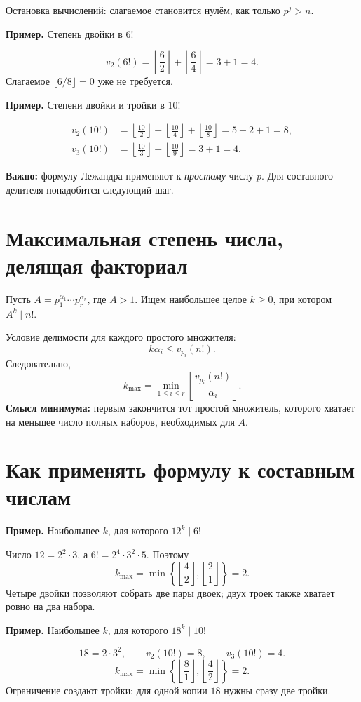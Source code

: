 \documentclass[a4paper,11pt]{article}
\newcommand{\key}[1]{\textcolor{deepaccent}{#1}}
\newcommand{\ex}[1]{\par\medskip\textcolor{deepaccent}{\textbf{Пример.} #1}\par\smallskip}
\newcommand{\nuval}[2]{v_{#1}(#2)}
\begin{document}
\key{Остановка вычислений:} слагаемое становится нулём, как только $p^j>n$.

\ex{Степень двойки в $6!$}
\[
\nuval{2}{6!}=\left\lfloor\frac62\right\rfloor+
\left\lfloor\frac64\right\rfloor=3+1=\boxed{4}.
\]
Слагаемое $\lfloor 6/8\rfloor=0$ уже не требуется.

\ex{Степени двойки и тройки в $10!$}
\begin{align*}
\nuval{2}{10!}&=\left\lfloor\frac{10}{2}\right\rfloor+
\left\lfloor\frac{10}{4}\right\rfloor+
\left\lfloor\frac{10}{8}\right\rfloor=5+2+1=\boxed8,\\
\nuval{3}{10!}&=\left\lfloor\frac{10}{3}\right\rfloor+
\left\lfloor\frac{10}{9}\right\rfloor=3+1=\boxed4.
\end{align*}

\textbf{Важно:} формулу Лежандра применяют к \textit{простому} числу $p$. Для составного делителя понадобится следующий шаг.

\section{Максимальная степень числа, делящая факториал}
Пусть $A=p_1^{\alpha_1}\cdots p_r^{\alpha_r}$, где $A>1$. Ищем наибольшее целое $k\ge0$, при котором $A^k\mid n!$.

Условие делимости для каждого простого множителя:
\[
 k\alpha_i\le\nuval{p_i}{n!}.
\]
Следовательно,
\[
\boxed{\displaystyle k_{\max}=\min_{1\le i\le r}
\left\lfloor\frac{\nuval{p_i}{n!}}{\alpha_i}\right\rfloor.}
\]
\textbf{Смысл минимума:} первым закончится тот простой множитель, которого хватает на меньшее число полных наборов, необходимых для $A$.

\clearpage
\section{Как применять формулу к составным числам}
\ex{Наибольшее $k$, для которого $12^k\mid 6!$}
Число $12=2^2\cdot3$, а $6!=2^4\cdot3^2\cdot5$. Поэтому
\[
 k_{\max}=\min\left\{\left\lfloor\frac42\right\rfloor,
\left\lfloor\frac21\right\rfloor\right\}=\boxed2.
\]
Четыре двойки позволяют собрать две пары двоек; двух троек также хватает ровно на два набора.

\ex{Наибольшее $k$, для которого $18^k\mid10!$}
\[
18=2\cdot3^2,\qquad\nuval{2}{10!}=8,\qquad\nuval{3}{10!}=4.
\]
\[
 k_{\max}=\min\left\{\left\lfloor\frac81\right\rfloor,
\left\lfloor\frac42\right\rfloor\right\}=\boxed2.
\]
Ограничение создают тройки: для одной копии $18$ нужны сразу две тройки.
\end{document}
